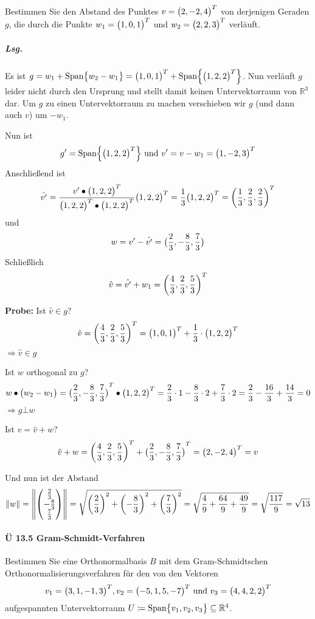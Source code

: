 \documentclass{scrreprt}
\begin{document}
Bestimmen Sie den Abstand des Punktes $v = \qty\big(2, -2, 4)^T$ von derjenigen
Geraden $g$, die durch die Punkte $w_1 = \qty\big(1, 0, 1)^T$ und
$w_2 = \qty\big(2, 2, 3)^T$ verläuft.

\subparagraph{Lsg.} Es ist $g = w_1 + \text{Span}\qty\big{w_2 - w_1}
= \qty\big(1, 0, 1)^T + \text{Span}\qty{\qty\big(1, 2, 2)^T}$.
Nun verläuft $g$ leider nicht durch den Ursprung und stellt damit keinen
Untervektorraum von $\mathbb{R}^3$ dar.
Um $g$ zu einen Untervektorraum zu machen verschieben wir $g$ (und dann auch
$v$) um $-w_1$.

Nun ist
\[
  g' =  \text{Span}\qty{\qty\big(1, 2, 2)^T}
  \text{ und }
  v' = v - w_1 = \qty\big(1, -2, 3)^T
\]
Anschließend ist
\[
  \hat{v'} = \frac{v' \bullet \qty\big(1, 2, 2)^T}{\qty\big(1, 2, 2)^T \bullet \qty\big(1, 2, 2)^T}\qty\big(1, 2, 2)^T
  = \frac{1}{3}\qty\big(1, 2, 2)^T
  = \qty(\frac{1}{3}, \frac{2}{3}, \frac{2}{3})^T
\]
und
\[
  w = v' - \hat{v'} = \qty\big(\frac{2}{3}, -\frac{8}{3}, \frac{7}{3})
\]
Schließlich
\[
  \hat{v} = \hat{v'} + w_1 = \qty(\frac{4}{3}, \frac{2}{3}, \frac{5}{3})^T
\]

\newpage
\textbf{Probe:} Ist $\hat{v} \in g$?
\[
  \hat{v} = \qty(\frac{4}{3}, \frac{2}{3}, \frac{5}{3})^T = \qty\big(1, 0, 1)^T + \frac{1}{3} \cdot \qty\big(1, 2, 2)^T
\]
$\Rightarrow \hat{v} \in g$

Ist $w$ orthogonal zu $g$?
\[
  w \bullet \qty\big(w_2 - w_1) =
  \qty\big(\frac{2}{3}, -\frac{8}{3}, \frac{7}{3})^T \bullet \qty\big(1, 2, 2)^T
  = \frac{2}{3} \cdot 1 - \frac{8}{3} \cdot 2 + \frac{7}{3} \cdot 2
  = \frac{2}{3} - \frac{16}{3} + \frac{14}{3} = 0
\]
$\Rightarrow g \bot w$

Ist $v = \hat{v} + w$?
\[
  \hat{v} + w =
  \qty(\frac{4}{3}, \frac{2}{3}, \frac{5}{3})^T + \qty\big(\frac{2}{3}, -\frac{8}{3}, \frac{7}{3})^T
  = \qty\big(2, -2, 4)^T = v
\]

Und nun ist der Abstand
\[
  \norm{w} = \norm{\begin{pmatrix}
    \frac{2}{3}  \\
    -\frac{8}{3} \\
    \frac{7}{3}  \\
  \end{pmatrix}} = \sqrt{
    \qty(\frac{2}{3})^2 + \qty(-\frac{8}{3})^2 + \qty(\frac{7}{3})^2
  } = \sqrt{
    \frac{4}{9} + \frac{64}{9} + \frac{49}{9}
  } = \sqrt{\frac{117}{9}} = \sqrt{13}
\]

\paragraph{Ü 13.5 Gram-Schmidt-Verfahren} Bestimmen Sie eine Orthonormalbasis $B$
mit dem Gram-Schmidtschen Orthonormalisierungsverfahren für den von den Vektoren
\[
  v_1 = \qty\big(3, 1, -1, 3)^T, v_2 = \qty\big(-5, 1, 5, -7)^T
  \text{ und } v_3 = \qty\big(4, 4, 2, 2)^T
\]
aufgespannten Untervektorraum
$U \coloneqq \text{Span}\qty\big{v_1, v_2, v_3} \subseteq \mathbb{R}^4$.
\end{document}
